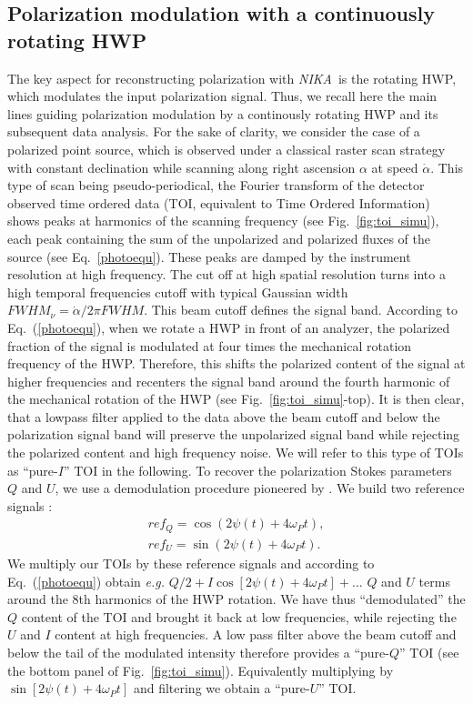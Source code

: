 \documentclass[twocolumn, traditabstract]{aa}
\newcommand{\nika}{{\it NIKA}}
\begin{document}
\subsection{Polarization modulation with a continuously rotating HWP}
\label{se:lockin}
The key aspect for reconstructing polarization with \nika\ is the rotating HWP,
which modulates the input polarization signal.  Thus, we recall here the main
lines guiding polarization modulation by a continously rotating HWP and its
subsequent data analysis. For the sake of clarity, we consider the case of a
polarized point source, which is observed under a classical raster scan strategy
with constant declination while scanning along right ascension $\alpha$ at speed
$\dot{\alpha}$. This type of scan being pseudo-periodical, the Fourier transform
of the detector observed time ordered data (TOI, equivalent to Time Ordered Information) shows peaks at harmonics of the
scanning frequency (see Fig.~\ref{fig:toi_simu}), each peak containing the sum of
the unpolarized and polarized fluxes of the source (see
Eq.~\ref{photoequ}). These peaks are damped by the instrument resolution at
high frequency. The cut off at
high spatial resolution turns into a high temporal frequencies cutoff with
typical Gaussian width $FWHM_\nu = \dot{\alpha}/2\pi FWHM$. This beam cutoff
defines the signal band. According to Eq.~(\ref{photoequ}), when we rotate a HWP
in front of an analyzer, the polarized fraction of the signal is modulated at
four times the mechanical rotation frequency of the HWP. Therefore, this shifts the
polarized content of the signal at higher frequencies and recenters the signal
band around the fourth harmonic of the mechanical rotation of the HWP (see
Fig.~\ref{fig:toi_simu}-top). It is then clear, that a lowpass filter applied to
the data above the beam cutoff and below the polarization signal band will
preserve the unpolarized signal band while rejecting the polarized content and
high frequency noise. We will refer to this type of TOIs as ``pure-$I$''
TOI in the following. To recover the polarization Stokes parameters $Q$
and $U$, we use a demodulation procedure pioneered by \cite{johnson2007}. We
build two reference signals :
\begin{eqnarray}
ref_Q = \cos(2\psi(t) + 4\omega_Pt), \nonumber \\
ref_U = \sin(2\psi(t) + 4\omega_Pt).
\end{eqnarray}
We multiply our TOIs by these reference signals and according
to Eq.~(\ref{photoequ}) obtain {\it e.g.} $Q/2 + I\cos[2\psi(t)+4\omega_Pt] +...$ $Q$
and $U$ terms around the 8th harmonics of the HWP rotation. We have thus
``demodulated'' the $Q$ content of the TOI and brought it back at low
frequencies, while rejecting the $U$ and $I$ content at high frequencies. A low
pass filter above the beam cutoff and below the tail of the modulated intensity
therefore provides a ``pure-$Q$''  TOI (see the bottom panel of
Fig.~\ref{fig:toi_simu}). Equivalently multiplying by
$\sin\left[2\psi(t)+4\omega_Pt\right]$ and filtering we obtain a ``pure-$U$'' TOI.
\end{document}
